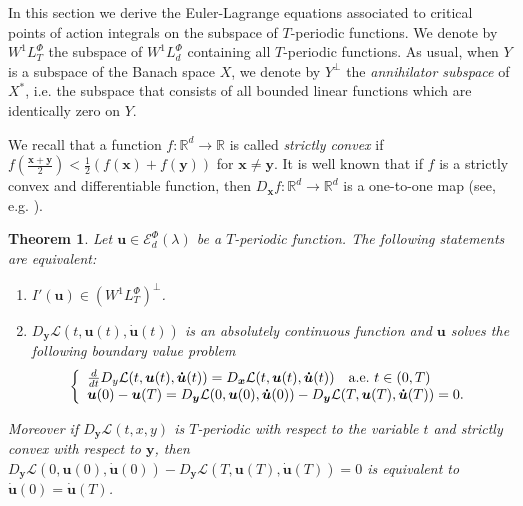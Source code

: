 \documentclass[twoside]{elsarticle}
\newtheorem{thm}{Theorem}[section]
\theoremstyle{remark}
\newcommand{\lphi}{L^{\Phi}}
\newcommand{\wphi}{W^{1}\lphi}
\newcommand{\domi}{\mathcal{E}^{\Phi}_d(\lambda)}
\renewcommand{\b}[1]{\boldsymbol{#1}}
\begin{document}
In this section we derive the Euler-Lagrange equations associated to critical points of action integrals on the subspace of $T$-periodic functions.  We denote by $\wphi_T$ the subspace of $\wphi_d$ containing all  $T$-periodic functions. As usual, when $Y$ is a subspace of
the Banach space $X$, we denote by $Y^{\perp}$ the \emph{annihilator subspace} of $X^*$, i.e. the subspace
that consists of all  bounded linear functions which are identically zero on $Y$.

We recall that  a function $f: \mathbb{R}^d \to \mathbb{R}$ is called \emph{strictly convex} if 
$f\left(\tfrac{\b{x}+\b{y}}{2}\right)< \tfrac{1}{2} \left(f\left(
\b{x}\right)+f\left( \b{y}\right)\right)$ for  $\b{x}\neq\b{y}$.  
It is  well known that if $f$ is a strictly convex and differentiable function, then
$D_{\b{x}}f:\mathbb{R}^d\to\mathbb{R}^d$ is a one-to-one map  (see, e.g. \cite[Thm. 12.17]{rockafellar2009variational}).


\begin{thm}\label{critpoint} Let $\b{u}\in\domi$ be  a $T$-periodic function. The following statements are equivalent:
\begin{enumerate}
 \item $I'(\b{u})\in\left( \wphi_T\right)^{\perp}$.
 \item  $D_{\b{y}}\mathcal{L}(t,\b{u}(t),\b{\dot{u}}(t))$ is an absolutely continuous function and $\b{u}$ solves the following boundary value problem
 \begin{equation}\label{ecualagran2}
    \left\{%
\begin{array}{ll}
   \frac{d}{dt} D_{y}\mathcal{L}(t,\b{u}(t),\b{\dot{u}}(t))= D_{\b{x}}\mathcal{L}(t,\b{u}(t),\b{\dot{u}}(t)) \quad \hbox{a.e.}\ t \in (0,T)\\
    \b{u}(0)-\b{u}(T)=D_{\b{y}}\mathcal{L}(0,\b{u}(0),\b{\dot{u}}(0))-D_{\b{y}}\mathcal{L}(T,\b{u}(T),\b{\dot{u}}(T))=0.
\end{array}%
\right.
\end{equation}
\end{enumerate}
Moreover if $D_{\b{y}}\mathcal{L}(t,x,y)$ is $T$-periodic with respect to the variable $t$ and strictly convex with respect to $\b{y}$, then
$D_{\b{y}}\mathcal{L}(0,\b{u}(0),\b{\b{\dot{\b{u}}}}(0))-D_{\b{y}}\mathcal{L}(T,\b{u}(T),\b{\dot{u}}(T))=0$ is equivalent to $\b{\dot{u}}(0)=\b{\dot{u}}(T)$.
\end{thm}
\end{document}
